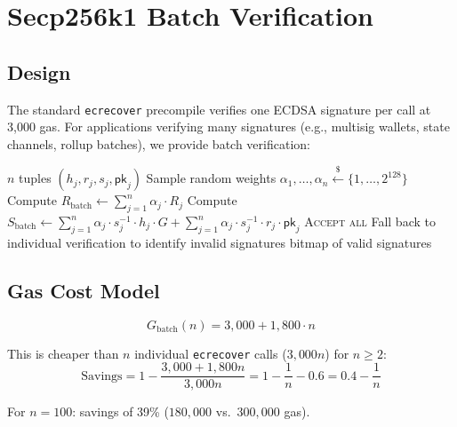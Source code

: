 \section{Secp256k1 Batch Verification}
\label{sec:batch}

\subsection{Design}

The standard \texttt{ecrecover} precompile verifies one ECDSA signature per call at 3,000 gas. For applications verifying many signatures (e.g., multisig wallets, state channels, rollup batches), we provide batch verification:

\begin{algorithm}[H]
\caption{Secp256k1 Batch Signature Verification}
\label{alg:batch_ecdsa}
\begin{algorithmic}[1]
\Require $n$ tuples $(h_j, r_j, s_j, \mathsf{pk}_j)$
\State Sample random weights $\alpha_1, \ldots, \alpha_n \xleftarrow{\$} \{1, \ldots, 2^{128}\}$
\State Compute $R_{\text{batch}} \gets \sum_{j=1}^n \alpha_j \cdot R_j$ 
\State Compute $S_{\text{batch}} \gets \sum_{j=1}^n \alpha_j \cdot s_j^{-1} \cdot h_j \cdot G + \sum_{j=1}^n \alpha_j \cdot s_j^{-1} \cdot r_j \cdot \mathsf{pk}_j$
    \State \Return \textsc{Accept all}
\Else
    \State Fall back to individual verification to identify invalid signatures
    \State \Return bitmap of valid signatures
\EndIf
\end{algorithmic}
\end{algorithm}

\subsection{Gas Cost Model}

\begin{equation}
    G_{\text{batch}}(n) = 3{,}000 + 1{,}800 \cdot n
\end{equation}

This is cheaper than $n$ individual \texttt{ecrecover} calls ($3{,}000n$) for $n \geq 2$:
\begin{equation}
    \text{Savings} = 1 - \frac{3{,}000 + 1{,}800n}{3{,}000n} = 1 - \frac{1}{n} - 0.6 = 0.4 - \frac{1}{n}
\end{equation}

For $n = 100$: savings of 39\% ($180{,}000$ vs.\ $300{,}000$ gas).

